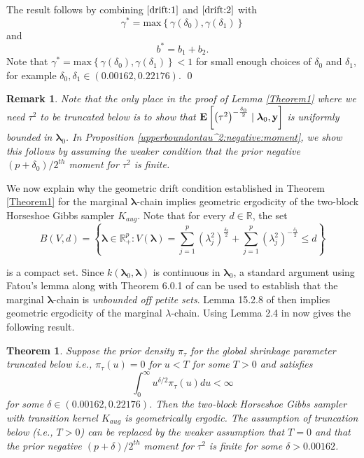 \documentclass[noinfoline,11pt]{imsart}
\numberwithin{equation}{section}
\theoremstyle{plain}
\newtheorem{thm}{Theorem}[section]
\newtheorem{remark}{Remark}[section]
\newcommand{\bl}{\boldsymbol{\lambda}}
\newcommand\Myciteauthor[1]{\citeauthor{#1} \cite{#1}}
\begin{document}
\noindent
The result follows by combining $\eqref{drift:1}$ and $\eqref{drift:2}$ with $$\gamma^*=\text{max}\left\{\gamma\left(\delta_0\right),\gamma\left(\delta_1\right)\right\}$$ and $$b^*=b_1+b_2.$$ 
Note that $\gamma^*=\text{max}\left\{\gamma\left(\delta_0\right),\gamma\left(\delta_1\right)\right\} < 1$ for small enough choices of $\delta_0$ and 
$\delta_1$, for example $\delta_0,\delta_1\in (0.00162, 0.22176)$. \qed

\begin{remark} \label{Horseshoe:negative:moment}
Note that the only place in the proof of Lemma \ref{Theorem1} where we 
need $\tau^2$ to be truncated below is to show that ${\bf E} \left[ 
\left( \tau^2 \right)^{-\frac{\delta_0}{2}} \mid \bl_0, {\bf y} \right]$ 
is uniformly bounded in $\bl_0$. In 
Proposition \ref{upperboundontau^2:negative:moment}, we show this follows by assuming the weaker condition that the {\it prior} negative $(p+\delta_0)/2^{th}$ moment for $\tau^2$ is finite. 
\end{remark}

\noindent
We now explain why the geometric drift condition established in 
Theorem \ref{Theorem1} for the marginal $\bl$-chain implies geometric 
ergodicity of the two-block Horseshoe Gibbs sampler $K_{aug}$. Note that 
for every $d \in \mathbb{R}$, the set 
$$
B \left( V,d \right) = \left\{\bl \in \mathbb{R}_+^p: V(\bl)=\sum_{j=1}^p\left(\lambda_{j}^2\right)^{\frac{\delta_0}{2}}+\sum_{j=1}^p\left(\lambda_{j}^2\right)^{-\frac{\delta_1}{2}} \leq d\right\}
$$ \label{originalhorseshoeminorizationset}

\noindent
is a compact set. Since $k(\bl_0, \bl)$ is continuous in $\bl_0$, a 
standard argument using Fatou's lemma along with Theorem 6.0.1 of \Myciteauthor{meyn1993markov} can be used to establish that 
the marginal $\bl$-chain is {\it unbounded off petite sets}. 
 Lemma 15.2.8 of \Myciteauthor{meyn1993markov} then implies 
geometric ergodicity of the marginal $\lambda$-chain. Using   Lemma 2.4 in \Myciteauthor{diaconis2008} now 
gives the following result. 
\begin{thm} \label{Theorem 2.1}
Suppose the prior density $\pi_\tau$ for the global shrinkage parameter 
truncated below i.e., $\pi_\tau (u) = 0$ for $ u < T$ for some $T > 0$ and satisfies $$\int_0^{\infty}u^{\delta/2}\pi_\tau\left(u\right)du<\infty$$ for some $\delta\in (0.00162, 0.22176)$. 
Then the two-block Horseshoe Gibbs sampler with transition kernel $K_{aug}$
is geometrically ergodic. The assumption of truncation below (i.e., 
$T > 0$) can be replaced by the weaker assumption that $T = 0$ and that 
the {\it prior} negative $(p+\delta)/2^{th}$ moment for $\tau^2$ is 
finite for some $\delta > 0.00162$. 
\end{thm}
\end{document}
